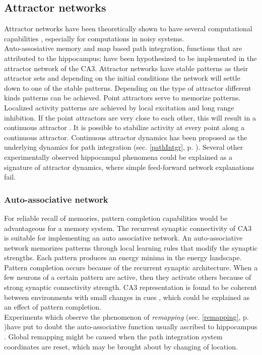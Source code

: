 \subsection{Attractor networks}
Attractor networks have been theoretically shown to have several computational capabilities \cite{Amit1992}, especially for computations in noisy systems.\\
Auto-assosiative memory and map based path integration, functions that are attributed to the hippocampus; have been hypothesized to be implemented in the attractor network of the CA3. Attractor networks have stable patterns as their attractor sets and depending on the initial conditions the network will settle down to one of the stable patterns. Depending on the type of attractor different kinds patterns can be achieved. Point attractors serve to memorize patterns. Localized activity patterns are achieved by local excitation and long range inhibition. If the point attractors are very close to each other, this will result in a continuous attractor \cite{Trappenberg2003}. It is possible to stabilize activity at every point along a continuous attractor. Continuous attractor dynamics has been proposed as the underlying dynamics for path integration (sec. \ref{pathIntgr}, p. \pageref{pathIntgr}). Several other experimentally observed hippocampal phenomena could be explained as a signature of attractor dynamics, where simple feed-forward network explanations fail.\\

\subsubsection{Auto-associative network}
\label{autoasso}
For reliable recall of memories, pattern completion capabilities would be advantageous for a memory system. The recurrent synaptic connectivity of CA3 is suitable for implementing an auto associative network. An auto-associative network memorizes patterns through local learning rules that modify the synaptic strengths. Each pattern produces an energy minima in the energy landscape. Pattern completion occurs because of the recurrent synaptic architecture. When a few neurons of a certain pattern are active, then they activate others because of strong synaptic connectivity strength. CA3 representation is found to be coherent between environments with small changes in cues \cite{Lee2004, Vazdarjanova2004}, which could be explained as an effect of pattern completion. \\
Experiments which observe the phenomenon of \emph{remapping} \cite{Kubie1987, Wills2005, Leutgeb2005} (sec. \ref{remapping}, p. \pageref{remapping})have put to doubt the auto-associative function usually ascribed to  hippocampus \cite{Colgin2010}. Global remapping might be caused when the path integration system coordinates are reset, which may be brought about by changing of location.   

